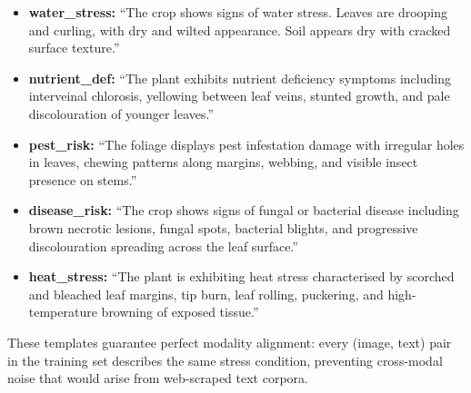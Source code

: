 \documentclass[conference]{IEEEtran}
\begin{document}
\begin{itemize}
  \item \textbf{water\_stress:} ``The crop shows signs of water stress. Leaves
  are drooping and curling, with dry and wilted appearance. Soil appears dry
  with cracked surface texture.''

  \item \textbf{nutrient\_def:} ``The plant exhibits nutrient deficiency
  symptoms including interveinal chlorosis, yellowing between leaf veins,
  stunted growth, and pale discolouration of younger leaves.''

  \item \textbf{pest\_risk:} ``The foliage displays pest infestation damage
  with irregular holes in leaves, chewing patterns along margins, webbing,
  and visible insect presence on stems.''

  \item \textbf{disease\_risk:} ``The crop shows signs of fungal or bacterial
  disease including brown necrotic lesions, fungal spots, bacterial blights,
  and progressive discolouration spreading across the leaf surface.''

  \item \textbf{heat\_stress:} ``The plant is exhibiting heat stress
  characterised by scorched and bleached leaf margins, tip burn, leaf rolling,
  puckering, and high-temperature browning of exposed tissue.''
\end{itemize}

These templates guarantee perfect modality alignment: every (image, text) pair
in the training set describes the same stress condition, preventing
cross-modal noise that would arise from web-scraped text corpora.
\end{document}
